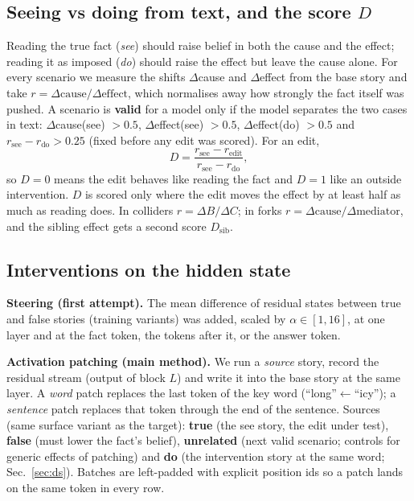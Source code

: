 \documentclass[conference]{IEEEtran}
\newcommand{\D}{\ensuremath{D}}
\begin{document}
\subsection{Seeing vs doing from text, and the score \D}
Reading the true fact (\emph{see}) should raise belief in both the cause and the effect; reading it as imposed (\emph{do}) should raise the effect but leave the cause alone. For every scenario we measure the shifts $\Delta$cause and $\Delta$effect from the base story and take $r = \Delta\text{cause}/\Delta\text{effect}$, which normalises away how strongly the fact itself was pushed. A scenario is \textbf{valid} for a model only if the model separates the two cases in text: $\Delta$cause(see) $>0.5$, $\Delta$effect(see) $>0.5$, $\Delta$effect(do) $>0.5$ and $r_\text{see}-r_\text{do}>0.25$ (fixed before any edit was scored). For an edit,
\begin{equation}
D = \frac{r_\text{see} - r_\text{edit}}{r_\text{see} - r_\text{do}},
\end{equation}
so $D=0$ means the edit behaves like reading the fact and $D=1$ like an outside intervention. $D$ is scored only where the edit moves the effect by at least half as much as reading does. In colliders $r=\Delta B/\Delta C$; in forks $r=\Delta\text{cause}/\Delta\text{mediator}$, and the sibling effect gets a second score $D_\text{sib}$.

\subsection{Interventions on the hidden state}
\textbf{Steering (first attempt).} The mean difference of residual states between true and false stories (training variants) was added, scaled by $\alpha\in[1,16]$, at one layer and at the fact token, the tokens after it, or the answer token.

\textbf{Activation patching (main method).} We run a \emph{source} story, record the residual stream (output of block $L$) and write it into the base story at the same layer. A \emph{word} patch replaces the last token of the key word (``long''$\leftarrow$``icy''); a \emph{sentence} patch replaces that token through the end of the sentence. Sources (same surface variant as the target): \textbf{true} (the see story, the edit under test), \textbf{false} (must lower the fact's belief), \textbf{unrelated} (next valid scenario; controls for generic effects of patching) and \textbf{do} (the intervention story at the same word; Sec.~\ref{sec:ds}). Batches are left-padded with explicit position ids so a patch lands on the same token in every row.
\end{document}
